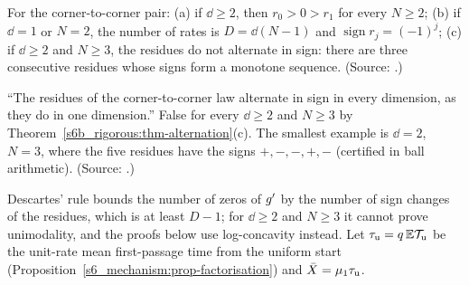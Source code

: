 \begin{theorem}\label{s6b_rigorous:thm-alternation}
For the corner-to-corner pair:
(a) if $\dd\ge2$, then $r_0>0>r_1$ for every $N\ge2$;
(b) if $\dd=1$ or $N=2$, the number of rates is $D=\dd(N-1)$ and $\operatorname{sign}r_j=(-1)^j$;
(c) if $\dd\ge2$ and $N\ge3$, the residues do not alternate in sign: there are three consecutive residues
whose signs form a monotone sequence.
\textup{(Source: .)}
\end{theorem}

\begin{refuted}\label{s6b_rigorous:ref-alternation}
``The residues of the corner-to-corner law alternate in sign in every dimension, as they do in one dimension.''
False for every $\dd\ge2$ and $N\ge3$ by Theorem~\ref{s6b_rigorous:thm-alternation}(c). The smallest example is
$\dd=2$, $N=3$, where the five residues have the signs $+,-,-,+,-$ (certified in ball arithmetic).
\textup{(Source: .)}
\end{refuted}

Descartes' rule bounds the number of zeros of $g'$ by the number of sign changes of the residues, which is at least
$D-1$; for $\dd\ge2$ and $N\ge3$ it cannot prove unimodality, and the proofs below use log-concavity instead. Let
$\tau_{\mathrm u}=q\,\mathbb{E}\mathcal{T}_{\mathrm u}$ be the unit-rate mean first-passage time from the uniform start
(Proposition~\ref{s6_mechanism:prop-factorisation}) and $\bar X=\mu_{1}\tau_{\mathrm u}$.

